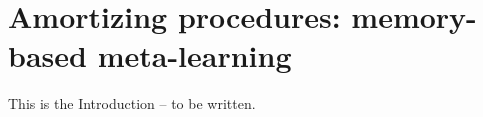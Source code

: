 \chapter{Amortizing procedures: memory-based meta-learning}
\label{introduction}


This is the Introduction -- to be written.